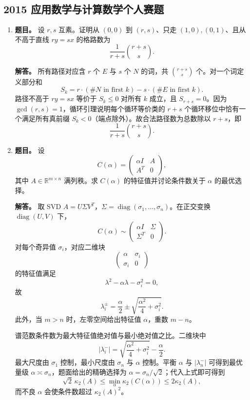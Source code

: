 ﻿\documentclass[UTF8,12pt]{ctexart}
\begin{document}
\subsection{2015 应用数学与计算数学个人赛题}
\begin{enumerate}[label=\textbf{\arabic*.},leftmargin=2.2em]
\item \textbf{题目。} 设 \(r,s\) 互素。证明从 \((0,0)\) 到 \((r,s)\)、只走 \((1,0),(0,1)\)、且从不高于直线 \(ry=sx\) 的格路数为
\[
\frac1{r+s}\binom{r+s}{s}.
\]

\textbf{解答。} 所有路径对应含 \(r\) 个 \(E\) 与 \(s\) 个 \(N\) 的词，共 \(\binom{r+s}{s}\) 个。对一个词定义部分和
\[
S_k=r\cdot(\#N\text{ in first }k)-s\cdot(\#E\text{ in first }k).
\]
路径不高于 \(ry=sx\) 等价于 \(S_k\le0\) 对所有 \(k\) 成立，且 \(S_{r+s}=0\)。因为 \(\gcd(r,s)=1\)，循环引理说明每个循环等价类的 \(r+s\) 个循环移位中恰有一个满足所有真前缀 \(S_k<0\)（端点除外）。故合法路径数为总数除以 \(r+s\)，即
\[
\frac1{r+s}\binom{r+s}{s}.
\]

\item \textbf{题目。} 设
\[
C(\alpha)=\begin{pmatrix}\alpha I&A\\A^T&0\end{pmatrix},
\]
其中 \(A\in\mathbb R^{m\times n}\) 满列秩。求 \(C(\alpha)\) 的特征值并讨论条件数关于 \(\alpha\) 的最优选择。

\textbf{解答。} 取 SVD \(A=U\Sigma V^T\)，\(\Sigma=\operatorname{diag}(\sigma_1,\ldots,\sigma_n)\)。在正交变换 \(\operatorname{diag}(U,V)\) 下，
\[
C(\alpha)\sim
\begin{pmatrix}\alpha I&\Sigma\\\Sigma^T&0\end{pmatrix}.
\]
对每个奇异值 \(\sigma_i\)，对应二维块
\[
\begin{pmatrix}\alpha&\sigma_i\\ \sigma_i&0\end{pmatrix}
\]
的特征值满足
\[
\lambda^2-\alpha\lambda-\sigma_i^2=0,
\]
故
\[
\lambda_i^\pm=\frac{\alpha}{2}\pm\sqrt{\frac{\alpha^2}{4}+\sigma_i^2}.
\]
此外，当 \(m>n\) 时，左零空间给出特征值 \(\alpha\)，重数 \(m-n\)。

谱范数条件数为最大特征值绝对值与最小绝对值之比。二维块中
\[
|\lambda_i^-|=\sqrt{\frac{\alpha^2}{4}+\sigma_i^2}-\frac\alpha2.
\]
最大尺度由 \(\sigma_1\) 控制，最小尺度由 \(\sigma_n\) 与 \(\alpha\) 控制。平衡 \(\alpha\) 与 \(|\lambda_n^-|\) 可得到最优量级 \(\alpha\asymp\sigma_n\)，题面给出的精确选择为 \(\alpha=\sigma_n/\sqrt2\)；代入上式即可得到
\[
\sqrt2\,\kappa_2(A)\le \min_\alpha\kappa_2(C(\alpha))\le 2\kappa_2(A),
\]
而不良 \(\alpha\) 会使条件数超过 \(\kappa_2(A)^2\)。


\end{enumerate}
\end{document}
